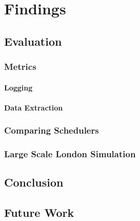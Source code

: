 \documentclass[a4paper,11pt,titlepage]{report}
\begin{document}
\section{}


\newpage
\part{Findings}
\chapter{Evaluation}
\section{Metrics}
\subsection{Logging}
\subsection{Data Extraction}

\section{Comparing Schedulers}

\section{Large Scale London Simulation}

\newpage
\chapter{Conclusion}

\newpage
\chapter{Future Work}
\end{document}
